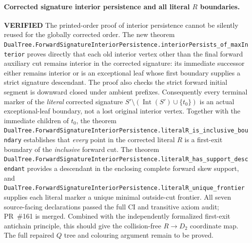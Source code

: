 \documentclass[11pt]{article}
\newcommand{\ok}{\textcolor{green!40!black}{\textbf{VERIFIED}}}
\newcommand{\lean}[1]{\texttt{#1}}
\begin{document}
\paragraph{Corrected signature interior persistence and all literal $R$ boundaries.} \ok
The printed-order proof of interior persistence cannot be
silently reused for the globally corrected order.
The new theorem
\lean{DualTree.ForwardSignatureInteriorPersistence.interiorPersists_of_maxInterior}
proves directly that each old interior vertex other
than the final forward auxiliary cut remains interior
in the corrected signature: its immediate successor
either remains interior or is an exceptional leaf
whose first boundary supplies a strict signature
descendant. The proof also checks the strict forward
initial segment is downward closed under ambient
prefixes.
Consequently every terminal marker of the
\emph{literal} corrected signature
$S'\setminus(\operatorname{Int}(S')\cup\{t_0\})$
is an actual exceptional-leaf boundary, not a
lost original interior vertex.
Together with the immediate children of $t_0$,
the theorem
\lean{DualTree.ForwardSignatureInteriorPersistence.literalR_is_inclusive_boundary}
establishes that \emph{every} point in the
corrected literal $R$ is a first-exit boundary
of the \emph{inclusive} forward cut.
The theorem
\lean{DualTree.ForwardSignatureInteriorPersistence.literalR_has_support_descendant}
provides a descendant in the enclosing complete
forward skew support, and
\lean{DualTree.ForwardSignatureInteriorPersistence.literalR_unique_frontier}
supplies each literal marker a unique minimal
outside-cut frontier.
All seven source-facing declarations passed the full CI and transitive axiom audit; PR~\#161 is merged.
Combined with the independently formalized
first-exit antichain principle, this should give
the collision-free $R\to D_2$ coordinate map.
The full repaired $Q$ tree and colouring argument
remain to be proved.
\end{document}
